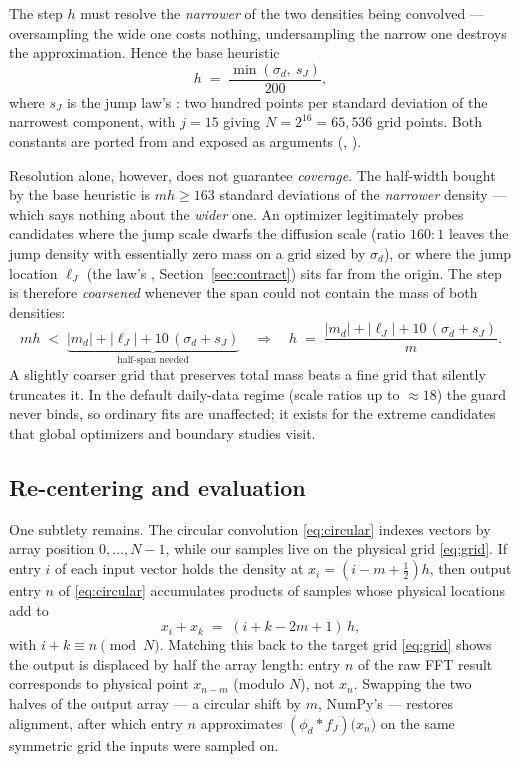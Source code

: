 \begin{decision}
\label{dec:h-heuristic}
The step $h$ must resolve the \emph{narrower} of the two densities being
convolved --- oversampling the wide one costs nothing, undersampling the
narrow one destroys the approximation. Hence the base heuristic
\[
  h \;=\; \frac{\min(\sigma_d,\ s_J)}{200},
\]
where $s_J$ is the jump law's : two hundred
points per standard deviation of the narrowest component, with $j = 15$
giving $N = 2^{16} = 65{,}536$ grid points. Both constants are ported from
\citet{Ospina2009} and exposed as arguments (, ).

Resolution alone, however, does not guarantee \emph{coverage}. The
half-width bought by the base heuristic is $mh \ge 163$ standard
deviations of the \emph{narrower} density --- which says nothing about
the \emph{wider} one. An optimizer legitimately probes candidates where
the jump scale dwarfs the diffusion scale (ratio $160{:}1$ leaves the
jump density with essentially zero mass on a grid sized by $\sigma_d$),
or where the jump location $\ell_J$ (the law's
, Section~\ref{sec:contract}) sits far
from the origin. The step is therefore \emph{coarsened} whenever the span
could not contain the mass of both densities:
\begin{equation}
  m h \;<\; \underbrace{|m_d| + |\ell_J| + 10\,(\sigma_d + s_J)}_{\text{half-span needed}}
  \quad\Longrightarrow\quad
  h \;=\; \frac{|m_d| + |\ell_J| + 10\,(\sigma_d + s_J)}{m}.
  \label{eq:coarsen}
\end{equation}
A slightly coarser grid that preserves total mass beats a fine grid that
silently truncates it. In the default daily-data regime (scale ratios up
to $\approx 18$) the guard never binds, so ordinary fits are unaffected;
it exists for the extreme candidates that global optimizers and boundary
studies visit.
\end{decision}

\subsection{Re-centering and evaluation}

One subtlety remains. The circular convolution \eqref{eq:circular} indexes
vectors by array position $0, \dots, N-1$, while our samples live on the
physical grid \eqref{eq:grid}. If entry $i$ of each input vector holds the
density at $x_i = (i - m + \tfrac12) h$, then output entry $n$ of
\eqref{eq:circular} accumulates products of samples whose physical
locations add to
\[
  x_i + x_k \;=\; (i + k - 2m + 1)\, h ,
\]
with $i + k \equiv n \pmod N$. Matching this back to the target grid
\eqref{eq:grid} shows the output is displaced by half the array length:
entry $n$ of the raw FFT result corresponds to physical point
$x_{n - m}$ (modulo $N$), not $x_n$. Swapping the two halves of the output
array --- a circular shift by $m$, NumPy's  --- restores
alignment, after which entry $n$ approximates
$(\phi_d * f_J)\bigl( x_n \bigr)$ on the same symmetric grid the inputs
were sampled on.

